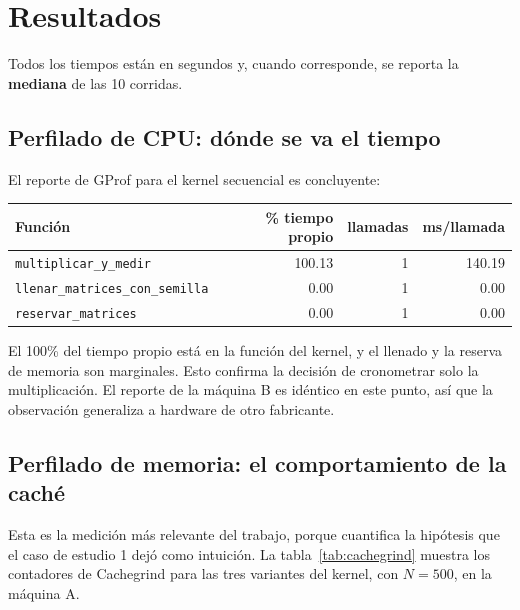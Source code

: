\section{Resultados}

Todos los tiempos están en segundos y, cuando corresponde, se reporta la \textbf{mediana} de las 10 corridas.

\subsection{Perfilado de CPU: dónde se va el tiempo}

El reporte de GProf para el kernel secuencial es concluyente:

\begin{center}
\begin{tabular}{|l|r|r|r|}
\hline
\textbf{Función} & \textbf{\% tiempo propio} & \textbf{llamadas} & \textbf{ms/llamada} \\
\hline
\texttt{multiplicar\_y\_medir} & 100.13 & 1 & 140.19 \\
\texttt{llenar\_matrices\_con\_semilla} & 0.00 & 1 & 0.00 \\
\texttt{reservar\_matrices} & 0.00 & 1 & 0.00 \\
\hline
\end{tabular}
\end{center}

El 100\% del tiempo propio está en la función del kernel, y el llenado y la reserva de memoria son marginales. Esto confirma la decisión de cronometrar solo la multiplicación. El reporte de la máquina B es idéntico en este punto, así que la observación generaliza a hardware de otro fabricante.

\subsection{Perfilado de memoria: el comportamiento de la caché}

Esta es la medición más relevante del trabajo, porque cuantifica la hipótesis que el caso de estudio 1 dejó como intuición. La tabla~\ref{tab:cachegrind} muestra los contadores de Cachegrind para las tres variantes del kernel, con $N=500$, en la máquina A.

